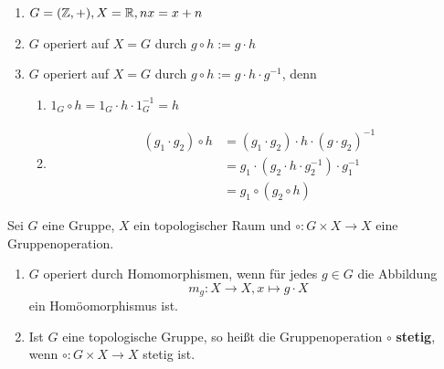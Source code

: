 \begin{beispiel}
    \begin{enumerate}[label=\arabic*),ref=\thebeispiel.\arabic*]
        \item $G = (\mathbb{Z}, +), X = \mathbb{R}, nx = x + n$\label{bsp:gruppenoperation1}
        \item $G$ operiert auf $X = G$ durch $g \circ h := g \cdot h$
        \item $G$ operiert auf $X = G$ durch $g \circ h := g \cdot h \cdot g^{-1}$, denn
        \begin{enumerate}[label=\roman*)]
            \item $1_G \circ h = 1_G \cdot h \cdot 1_G^{-1} = h$
            \item \begin{align*}
                    (g_1 \cdot g_2) \circ h &= (g_1 \cdot g_2) \cdot h \cdot (g \cdot g_2)^{-1}\\
                        &= g_1 \cdot (g_2 \cdot h \cdot g_2^{-1}) \cdot g_1^{-1}\\
                        &= g_1 \circ (g_2 \circ h)
                  \end{align*}
        \end{enumerate}
    \end{enumerate}
\end{beispiel}

\begin{definition}
    Sei $G$ eine Gruppe, $X$ ein topologischer Raum und
    $\circ: G \times X \rightarrow X$ eine Gruppenoperation.

    \begin{enumerate}[label=\alph*)]
        \item $G$ operiert durch Homomorphismen, wenn für jedes $g \in G$
              die Abbildung
              \[m_g: X \rightarrow X, x \mapsto g \cdot X\]
              ein Homöomorphismus ist.
        \item Ist $G$ eine topologische Gruppe, so heißt die Gruppenoperation $\circ$
              \textbf{stetig}, wenn 
              $\circ: G \times X \rightarrow X$ stetig ist.
    \end{enumerate}
\end{definition}

